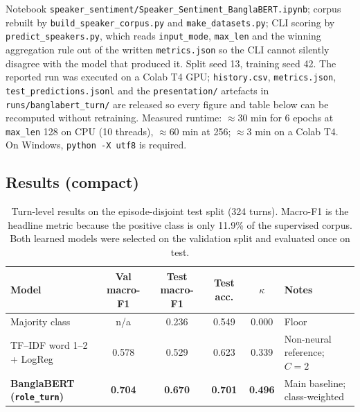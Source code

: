 \documentclass[11pt,a4paper]{article}
\newcommand{\thd}[1]{\textbf{\sffamily\small #1}}          %
\begin{document}
Notebook \texttt{speaker\_sentiment/Speaker\_Sentiment\_BanglaBERT.ipynb}; corpus rebuilt by
\texttt{build\_speaker\_corpus.py} and \texttt{make\_datasets.py}; CLI scoring by
\texttt{predict\_speakers.py}, which reads \texttt{input\_mode}, \texttt{max\_len} and the winning
aggregation rule out of the written \texttt{metrics.json} so the CLI cannot silently disagree with
the model that produced it. Split seed 13, training seed 42. The reported run was executed on a
Colab T4 GPU; \texttt{history.csv}, \texttt{metrics.json}, \texttt{test\_predictions.jsonl} and the
\texttt{presentation/} artefacts in \texttt{runs/banglabert\_turn/} are released so every figure and
table below can be recomputed without retraining. Measured runtime: $\approx$30 min for 6 epochs at
\texttt{max\_len} 128 on CPU (10 threads), $\approx$60 min at 256; $\approx$3 min on a Colab T4.
On Windows, \texttt{python -X utf8} is required.

\subsection{Results (compact)}

\begin{table}[htbp]\centering
\caption{Turn-level results on the episode-disjoint test split (324 turns). Macro-F1 is the
headline metric because the positive class is only 11.9\% of the supervised corpus. Both learned
models were selected on the validation split and evaluated once on test.}
\begin{tabular}{|l|c|c|c|c|L{3.1cm}|}
\hline
\thd{Model} & \thd{Val macro-F1} & \thd{Test macro-F1} & \thd{Test acc.} & \thd{$\kappa$} & \thd{Notes} \\ \hline
Majority class            & n/a    & 0.236 & 0.549 & 0.000 & Floor \\ \hline
TF--IDF word 1--2 + LogReg & 0.578 & 0.529 & 0.623 & 0.339 & Non-neural reference; $C=2$ \\ \hline
\textbf{BanglaBERT (\texttt{role\_turn})} & \textbf{0.704} & \textbf{0.670} & \textbf{0.701} & \textbf{0.496} & Main baseline; class-weighted \\ \hline
\end{tabular}
\end{table}
\end{document}
